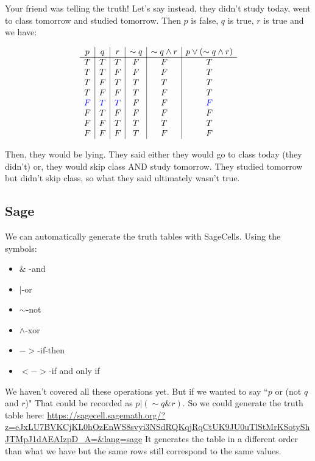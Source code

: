 Your friend was telling the truth!  Let's say instead, they didn't study today, went to class tomorrow and studied tomorrow.  Then $p$ is false, $q$ is true, $r$ is true and we have:

 $$\begin{array}{c|c|c|c|c|c}
p&q&r&\sim q & \sim q \wedge r& p\vee (\sim q \wedge r)\\
\hline
T & T&T&F&F&T\\
T&T&F&F&F&T \\
T&F&T&T&T&T\\
T&F&F&T&F&T\\
\textcolor{blue}F & \textcolor{blue}T&\textcolor{blue}T&F&F&\textcolor{blue}F\\
F&T&F&F&F&F\\
F&F&T&T&T&T\\
F&F&F&T&F&F
\end{array}$$

Then, they would be lying.  They said either they would go to class today (they didn't) or, they would skip class AND study tomorrow.  They studied tomorrow but didn't skip class, so what they said ultimately wasn't true.






\subsection{Sage}

We can automatically generate the truth tables with SageCells.  Using the symbols:

\begin{itemize}
\item    $\&$ -and
\item    $|$-or
\item    $\sim$-not
\item    $\wedge$-xor
 \item   $->$-if-then
\item    $<->$-if and only if
\end{itemize}


We haven't covered all these operations yet.  But if we wanted to say ``$p$ or (not $q$ and $r$)"  That could be recorded as $p|(\sim q\&r)$.  So we could generate the truth table here:  \url{https://sagecell.sagemath.org/?z=eJxLU7BVKCjKL0hOzEnWS8svyi3NSdRQKqjRqCtUK9JU0uTlStMrKSotyShJTMpJ1dAEAIzpD_A=&lang=sage}  It generates the table in a different order than what we have but the same rows still correspond to the same values.



